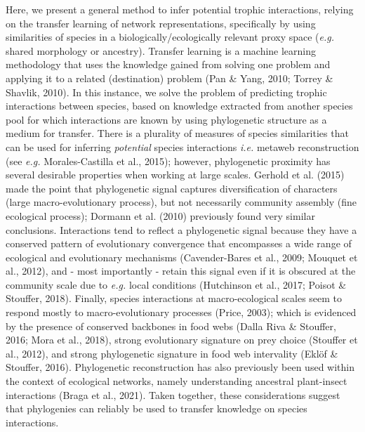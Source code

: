 \documentclass[11pt]{article}
\begin{document}
Here, we present a general method to infer potential trophic
interactions, relying on the transfer learning of network
representations, specifically by using similarities of species in a
biologically/ecologically relevant proxy space (\emph{e.g.} shared
morphology or ancestry). Transfer learning is a machine learning
methodology that uses the knowledge gained from solving one problem and
applying it to a related (destination) problem (Pan \& Yang, 2010;
Torrey \& Shavlik, 2010). In this instance, we solve the problem of
predicting trophic interactions between species, based on knowledge
extracted from another species pool for which interactions are known by
using phylogenetic structure as a medium for transfer. There is a
plurality of measures of species similarities that can be used for
inferring \emph{potential} species interactions \emph{i.e.} metaweb
reconstruction (see \emph{e.g.} Morales-Castilla et al., 2015); however,
phylogenetic proximity has several desirable properties when working at
large scales. Gerhold et al. (2015) made the point that phylogenetic
signal captures diversification of characters (large macro-evolutionary
process), but not necessarily community assembly (fine ecological
process); Dormann et al. (2010) previously found very similar
conclusions. Interactions tend to reflect a phylogenetic signal because
they have a conserved pattern of evolutionary convergence that
encompasses a wide range of ecological and evolutionary mechanisms
(Cavender-Bares et al., 2009; Mouquet et al., 2012), and - most
importantly - retain this signal even if it is obscured at the community
scale due to \emph{e.g.} local conditions (Hutchinson et al., 2017;
Poisot \& Stouffer, 2018). Finally, species interactions at
macro-ecological scales seem to respond mostly to macro-evolutionary
processes (Price, 2003); which is evidenced by the presence of conserved
backbones in food webs (Dalla Riva \& Stouffer, 2016; Mora et al.,
2018), strong evolutionary signature on prey choice (Stouffer et al.,
2012), and strong phylogenetic signature in food web intervality (Eklöf
\& Stouffer, 2016). Phylogenetic reconstruction has also previously been
used within the context of ecological networks, namely understanding
ancestral plant-insect interactions (Braga et al., 2021). Taken
together, these considerations suggest that phylogenies can reliably be
used to transfer knowledge on species interactions.
\end{document}
